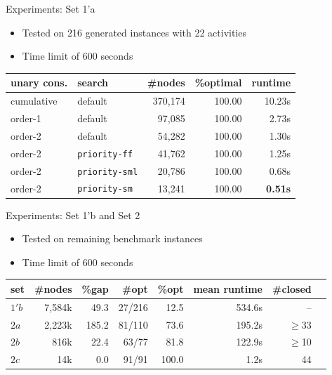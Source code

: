 \documentclass{beamer}
\begin{document}
\begin{frame}{Experiments: Set 1'a}
	\begin{itemize}
		\item Tested on 216 generated instances with 22 activities 
		\item Time limit of 600 seconds \pause
	\end{itemize}
	\begin{table}[tpb]
	\begin{adjustwidth}{-.9in}{-.9in}
    \centering
    \small
    \begin{tabular}{llrrr}
        \toprule
        unary cons. & search & \#nodes & \%optimal & runtime   \\
        \midrule
        cumulative & default & 370,174 & 100.00 & 10.23s \\
        order-1 & default & 97,085 & 100.00 & 2.73s \\
        order-2 & default & 54,282 & 100.00 & 1.30s \\
        \midrule\pause
        order-2 & {\tt priority-ff}    & 41,762 & 100.00 & 1.25s \\
        order-2 & {\tt priority-sml}    & 20,786 & 100.00 & 0.68s \\
        order-2 & {\tt priority-sm}    & 13,241 & 100.00 & {\color{red} {\bf 0.51s} }\\
        \bottomrule
    \end{tabular}
	\end{adjustwidth}
    \label{tab:resultsSet1a}
\end{table}
\end{frame}

\begin{frame}{Experiments: Set 1'b and Set 2}
	\begin{itemize}
		\item Tested on remaining benchmark instances
		\item Time limit of 600 seconds \pause
	\end{itemize}
	\begin{table}[ptb]
		\setlength{\tabcolsep}{5pt}
		\begin{tabular}{lrrrrrrr}
			\toprule
			set & \#nodes & \%gap & \#opt & \%opt & mean runtime & {\color{red} \#closed} \\
			\midrule
			$1'b$ & 7,584k & 49.3 & 27/216 & 12.5 & 534.6s & {\color{red} --} \\\midrule\pause
			$2a$ & 2,223k & 185.2 & 81/110 & 73.6 & 195.2s & {\color{red} $\geq$33 } \\\pause
			$2b$ & 816k & 22.4 & 63/77 & 81.8 & 122.9s & {\color{red} $\geq$10 } \\\pause
			$2c$ & 14k & 0.0 & 91/91 & 100.0 & 1.2s & {\color{red} 44 } \\
			\bottomrule
		\end{tabular}
		\label{tab:benchmarks}
	\end{table}
\end{frame}
\end{document}
